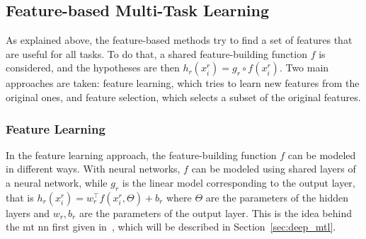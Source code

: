 \subsection{Feature-based Multi-Task Learning}\label{subsec:featbased_mtl}
As explained above, the feature-based methods try to find a set of features that are useful for all tasks.
To do that, a shared feature-building function $f$ is considered, and the hypotheses are then $h_r(x_i^r) = g_r \circ f(x_i^r)$.
Two main approaches are taken: feature learning, which tries to learn new features from the original ones, and feature selection, which selects a subset of the original features.



\subsubsection{Feature Learning}

In the feature learning approach, the feature-building function $f$ can be modeled in different ways. With neural networks, $f$ can be modeled using shared layers of a neural network, while $g_r$ is the linear model corresponding to the output layer, that is $h_r(x_i^r) = w_r^\intercal f(x_i^r, \Theta) + b_r$ where $\Theta$ are the parameters of the hidden layers and $w_r, b_r$ are the parameters of the output layer. 
This is the idea behind the \acrshort{mt} \acrshort{nn} first given in~\cite{Caruana97}, which will be described in Section~\ref{sec:deep_mtl}.
%

